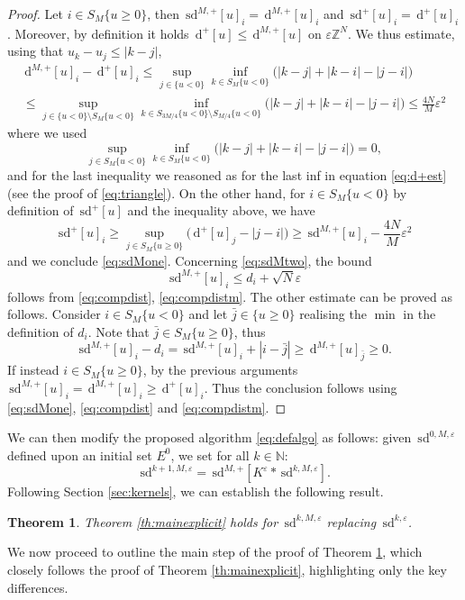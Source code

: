 \documentclass[10pt]{amsart}
\theoremstyle{plain}
\newtheorem{theorem}{Theorem}[section]
\theoremstyle{definition}
\newcommand{\Z}{\mathbb{Z}}
\newcommand{\N}{\mathbb{N}}
\newcommand{\e}{\varepsilon}
\newcommand{\ud}{\,\mathrm{d}}
\newcommand{\sd}{\,\mathrm{sd}}
\newcommand{\ez}{\e\Z^N}
\numberwithin{equation}{section}
\begin{document}
\begin{proof}
   Let $i\in S_M\{u\ge 0\}$, then $\sd^{M,+}[u]_i=\ud^{M,+}[u]_i$ and $\sd^{+}[u]_i=\ud^{+}[u]_i$. Moreover, by definition it holds $\ud^+[u]\le \ud^{M,+}[u]$ on $\ez$. We thus estimate, using that $u_k-u_j\le |k-j|$,
   \begin{multline*}
        \ud^{M,+}[u]_i-\ud^{+}[u]_i\le \sup_{j\in \{u< 0\}} \inf_{k\in S_M\{u< 0\}}   {(} |k-j| +|k-i|-|j-i|   {)}\\
        \le  \sup_{j\in \{u< 0\}\setminus S_M\{u<0\} } \inf_{k\in S_{3M/4}\{u< 0\}\setminus S_{M/4}\{u< 0\}}    {(}
        |k-j| +|k-i|-|j-i|   {)} \le \frac{4N}{M} \e^2
   \end{multline*}
where we used 
\[
\sup_{j\in S_M\{u< 0\}}\inf_{k\in S_M\{u< 0\}}   {(} |k-j| +|k-i|-|j-i|   {)}=0, 
\]
and for the last inequality we reasoned as for the last inf in  equation \eqref{eq:d+est} (see the proof of \eqref{eq:triangle}). On the other hand, for $i\in S_M\{u< 0\}$ by definition of $\sd^+[u]$ and the inequality above, we have 
\[ \sd^{+}[u]_i\ge \sup_{j\in S_M\{ u\ge 0\}}   {(} \ud^+[u]_j-|j-i|   {)}\ge \sd^{M,+}[u]_i - \frac{4N}{M} \e^2 \]
and we conclude \eqref{eq:sdMone}.
Concerning \eqref{eq:sdMtwo}, the bound
\[
\sd^{M,+}[u]_i\le d_i + \sqrt N \e
\]
follows from  \eqref{eq:compdist}, \eqref{eq:compdistm}.
The other estimate can be proved as follows.  Consider $i\in S_M\{u< 0\}$ and let $\bar j\in \{u\ge 0\}$ realising the $\min$ in the definition of $d_i$. Note that $\bar j\in S_M\{u\ge 0\}$, thus 
\[ \sd^{M,+}[u]_i-d_i= \sd^{M,+}[u]_i + |i-\bar j| \ge \ud^{M,+}[u]_{\bar j} \ge 0.\]
If instead $i\in S_M\{u\ge  0\}$, by the previous arguments $\sd^{M,+}[u]_i=\ud^{M,+}[u]_i\ge \ud^+[u]_i$. Thus the conclusion follows using \eqref{eq:sdMone}, \eqref{eq:compdist} and \eqref{eq:compdistm}.
\end{proof}

We can then modify the proposed algorithm \eqref{eq:defalgo} as follows: given $\sd^{0,M,\e} $ defined upon an initial set $E^0$, we set for all $k\in\N$:
\begin{equation}\label{eq:defalgoM}
    \sd^{k+1,M,\e} = \sd^{M,+}[K^\e \ast \sd^{k,M,\e} ].
\end{equation}
Following  Section \ref{sec:kernels}, we can establish the following result.
\begin{theorem}\label{th:strip}
Theorem \ref{th:mainexplicit} holds for $\sd^{k,M,\e}$ replacing $\sd^{k,\e}$.
\end{theorem}
We now proceed to outline the main step of the proof of Theorem \ref{th:strip}, which closely follows the proof of Theorem \ref{th:mainexplicit}, highlighting only the key differences. 
 
\end{document}
